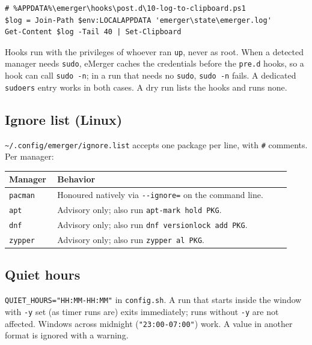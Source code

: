 \documentclass[11pt,a4paper]{article}
\begin{document}
\begin{lstlisting}[language=psplus]
# %APPDATA%\emerger\hooks\post.d\10-log-to-clipboard.ps1
$log = Join-Path $env:LOCALAPPDATA 'emerger\state\emerger.log'
Get-Content $log -Tail 40 | Set-Clipboard
\end{lstlisting}

\begin{warn}
Hooks run with the privileges of whoever ran \texttt{up}, never as root.
When a detected manager needs \texttt{sudo}, eMerger caches the
credentials before the \texttt{pre.d} hooks, so a hook can call
\texttt{sudo -n}; in a run that needs no \texttt{sudo}, \texttt{sudo -n}
fails. A dedicated \texttt{sudoers} entry works in both cases. A dry run
lists the hooks and runs none.
\end{warn}

\subsection{Ignore list (Linux)}\label{sec:ignore}
\verb|~/.config/emerger/ignore.list| accepts one package per line, with
\texttt{\#} comments. Per manager:

\begin{center}
\begin{tabular}{@{}p{0.15\linewidth} p{0.78\linewidth}@{}}
\toprule
\textbf{Manager} & \textbf{Behavior} \\
\midrule
\texttt{pacman} & Honoured natively via \texttt{-{}-ignore=} on the
                  command line. \\
\texttt{apt}    & Advisory only; also run \texttt{apt-mark hold PKG}. \\
\texttt{dnf}    & Advisory only; also run \texttt{dnf versionlock add PKG}. \\
\texttt{zypper} & Advisory only; also run \texttt{zypper al PKG}. \\
\bottomrule
\end{tabular}
\end{center}

\subsection{Quiet hours}
\texttt{QUIET\_HOURS="HH:MM-HH:MM"} in \texttt{config.sh}. A run that
starts inside the window with \texttt{-y} set (as timer runs are) exits
immediately; runs without \texttt{-y} are not affected. Windows across
midnight (\texttt{"23:00-07:00"}) work. A value in another format is
ignored with a warning.
\end{document}

